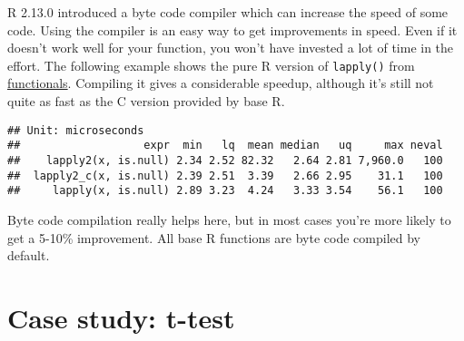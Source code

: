 R 2.13.0 introduced a byte code compiler which can increase the speed of
some code. Using the compiler is an easy way to get improvements in
speed. Even if it doesn't work well for your function, you won't have
invested a lot of time in the effort. The following example shows the
pure R version of \texttt{lapply()} from
\protect\hyperlink{lapply}{functionals}. Compiling it gives a
considerable speedup, although it's still not quite as fast as the C
version provided by base R.  

\begin{Shaded}
\begin{Highlighting}[]
\StringTok{ }
\StringTok{ }\NormalTok{(}\NormalTok{, }
   
\StringTok{ }
\NormalTok{  \}}
\NormalTok{\}}

\StringTok{ }\OperatorTok{::}

\StringTok{ }\NormalTok{(}\OperatorTok{:}\NormalTok{)}
\NormalTok{(}
\NormalTok{)}
\end{Highlighting}
\end{Shaded}

\begin{verbatim}
## Unit: microseconds
##                   expr  min   lq  mean median   uq     max neval
##    lapply2(x, is.null) 2.34 2.52 82.32   2.64 2.81 7,960.0   100
##  lapply2_c(x, is.null) 2.39 2.51  3.39   2.66 2.95    31.1   100
##     lapply(x, is.null) 2.89 3.23  4.24   3.33 3.54    56.1   100
\end{verbatim}

Byte code compilation really helps here, but in most cases you're more
likely to get a 5-10\% improvement. All base R functions are byte code
compiled by default.

\hypertarget{t-test}{%
\section{Case study: t-test}\label{t-test}}

